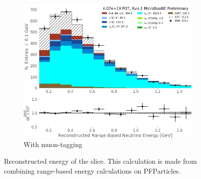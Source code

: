 \begin{figure}[H]
\begin{center}
\begin{subfigure}[b]{0.3\textwidth}
    \end{subfigure} %
    \begin{subfigure}[b]{0.3\textwidth}
    \centering
    \includegraphics[width=1.00\textwidth]{NuMuCCsel/Images/Ryan/Run1_recoErange_fullSel.jpg}
    \caption{\label{fig:NuMUCCsel:ryan:trklenFull} With muon-tagging}
    \end{subfigure}
\caption{Reconstructed energy of the slice. This calculation is made from combining range-based energy calculations on PFParticles.}
\end{center}
\end{figure}

